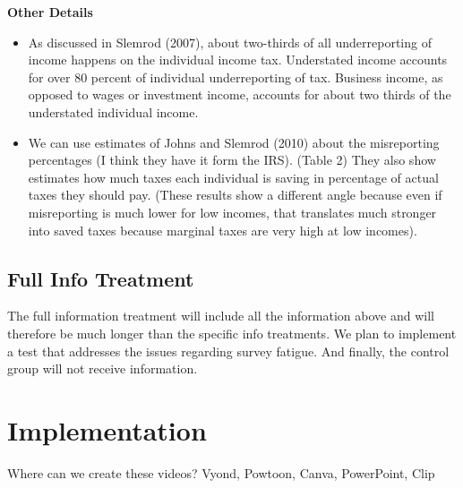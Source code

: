 \documentclass[12pt]{article}
\begin{document}
\textbf{Other Details}
\begin{itemize}
    \item As discussed in Slemrod (2007), about two-thirds of all underreporting of income happens on the individual income tax. Understated income accounts for over 80 percent of individual underreporting of tax. Business income, as opposed to wages or investment income, accounts for about two thirds of the understated individual income.
    \item We can use estimates of Johns and Slemrod (2010) about the misreporting percentages (I think they have it form the IRS). (Table 2) They also show estimates how much taxes each individual is saving in percentage of actual taxes they should pay. (These results show a different angle because even if misreporting is much lower for low incomes, that translates much stronger into saved taxes because marginal taxes are very high at low incomes). 

\end{itemize}




\subsection*{Full Info Treatment}
The full information treatment will include all the information above and will therefore be much longer than the specific info treatments. We plan to implement a test that addresses the issues regarding survey fatigue. And finally, the control group will not receive information. 

\section{Implementation}
Where can we create these videos? Vyond, Powtoon, Canva, PowerPoint, Clip 
\end{document}
